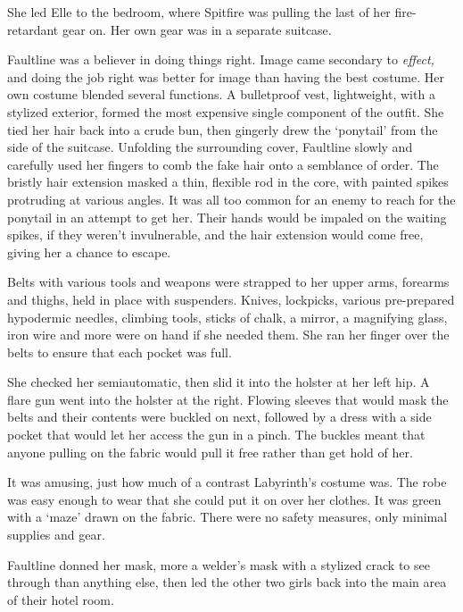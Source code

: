 She led Elle to the bedroom, where Spitfire was pulling the last of her fire-retardant gear on.  Her own gear was in a separate suitcase.



Faultline was a believer in doing things right.  Image came secondary to \emph{effect, }and doing the job right was better for image than having the best costume.  Her own costume blended several functions.  A bulletproof vest, lightweight, with a stylized exterior, formed the most expensive single component of the outfit.  She tied her hair back into a crude bun, then gingerly drew the `ponytail' from the side of the suitcase.  Unfolding the surrounding cover, Faultline slowly and carefully used her fingers to comb the fake hair onto a semblance of order.  The bristly hair extension masked a thin, flexible rod in the core, with painted spikes protruding at various angles.  It was all too common for an enemy to reach for the ponytail in an attempt to get her.  Their hands would be impaled on the waiting spikes, if they weren't invulnerable, and the hair extension would come free, giving her a chance to escape.



Belts with various tools and weapons were strapped to her upper arms, forearms and thighs, held in place with suspenders.  Knives, lockpicks, various pre-prepared hypodermic needles, climbing tools, sticks of chalk, a mirror, a magnifying glass, iron wire and more were on hand if she needed them.  She ran her finger over the belts to ensure that each pocket was full.



She checked her semiautomatic, then slid it into the holster at her left hip.  A flare gun went into the holster at the right.  Flowing sleeves that would mask the belts and their contents were buckled on next, followed by a dress with a side pocket that would let her access the gun in a pinch.  The buckles meant that anyone pulling on the fabric would pull it free rather than get hold of her.



It was amusing, just how much of a contrast Labyrinth's costume was.   The robe was easy enough to wear that she could put it on over her clothes.  It was green with a `maze' drawn on the fabric.  There were no safety measures, only minimal supplies and gear.



Faultline donned her mask, more a welder's mask with a stylized crack to see through than anything else, then led the other two girls back into the main area of their hotel room.




